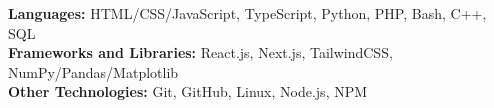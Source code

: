 

\begin{cvparagraph}

\textbf{Languages:} HTML/CSS/JavaScript, TypeScript, Python, PHP, Bash, C++, SQL \\
\textbf{Frameworks and Libraries:} React.js, Next.js, TailwindCSS, NumPy/Pandas/Matplotlib \\
\textbf{Other Technologies:} Git, GitHub, Linux, Node.js, NPM 
    
\end{cvparagraph}
